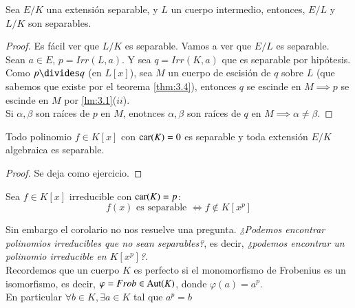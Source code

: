 \begin{pro}
    Sea $E/K$ una extensión separable, y $L$ un cuerpo intermedio, entonces, $E/L$ y $L/K$ son separables.
\end{pro}
\begin{proof}
    Es fácil ver que $L/K$ es separable. Vamos a ver que $E/L$ es separable.\\
    Sean $a \in E$, $p = Irr(L, a)$. Y sea $q = Irr(K, a)$ que es separable por hipótesis. Como $p \divides q$ (en $L[x]$), sea $M$ un cuerpo de escisión de $q$ sobre $L$ (que sabemos que existe por el teorema \ref{thm:3.4}), entonces $q$ se escinde en $M \implies p$ se escinde en $M$ por \ref{lm:3.1}($ii$).\\

    Si $\alpha, \beta$ son raíces de $p$ en $M$, enotnces $\alpha, \beta$ son raíces de $q$ en $M \implies \alpha \neq \beta$.
\end{proof}

\begin{lm}\label{lm:3.4.3}
    Todo polinomio $f \in K[x]$ con $\mathrm{car}(K) = 0$ es separable y toda extensión $E/K$ algebraica es separable.
\end{lm}
\begin{proof}
    Se deja como ejercicio.
\end{proof}

\begin{cor}\label{cor:3.4.4}
    Sea $f \in K[x]$ irreducible con $\mathrm{car}(K) = p$:
    $$
        f(x) \text{ es separable } \iff f \notin K[x^p]
    $$
\end{cor}

Sin embargo el corolario no nos resuelve una pregunta. \textit{¿Podemos encontrar polinomios irreducibles que no sean separables?}, es decir, \textit{ ¿podemos encontrar un polinomio irreducible en $K[x^p]$?}.\\

Recordemos que un cuerpo $K$ es perfecto si el monomorfismo de Frobenius es un isomorfismo, es decir, $\varphi = Frob \in \mathrm{Aut}(K)$, donde $\varphi(a) = a^p$.\\
En particular $\forall b \in K, \exists a \in K$ tal que $a^p = b$

